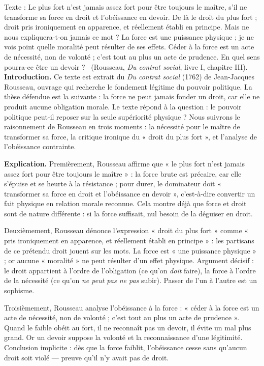 \documentclass[11pt]{article}
\begin{document}
\begin{exoresolu}
Texte : \guillemotleft Le plus fort n'est jamais assez fort pour être toujours le maître, s'il ne transforme sa force en droit et l'obéissance en devoir. De là le droit du plus fort ; droit pris ironiquement en apparence, et réellement établi en principe. Mais ne nous expliquera-t-on jamais ce mot ? La force est une puissance physique ; je ne vois point quelle moralité peut résulter de ses effets. Céder à la force est un acte de nécessité, non de volonté ; c'est tout au plus un acte de prudence. En quel sens pourra-ce être un devoir ? \guillemotright\ (Rousseau, \emph{Du contrat social}, livre I, chapitre III).
\tcblower
\textbf{Introduction.} Ce texte est extrait du \emph{Du contrat social} (1762) de Jean-Jacques Rousseau, ouvrage qui recherche le fondement légitime du pouvoir politique. La thèse défendue est la suivante : la force ne peut jamais fonder un droit, car elle ne produit aucune obligation morale. Le texte répond à la question : le pouvoir politique peut-il reposer sur la seule supériorité physique ? Nous suivrons le raisonnement de Rousseau en trois moments : la nécessité pour le maître de transformer sa force, la critique ironique du « droit du plus fort », et l'analyse de l'obéissance contrainte.

\textbf{Explication.} Premièrement, Rousseau affirme que « le plus fort n'est jamais assez fort pour être toujours le maître » : la force brute est précaire, car elle s'épuise et se heurte à la résistance ; pour durer, le dominateur doit « transformer sa force en droit et l'obéissance en devoir », c'est-à-dire convertir un fait physique en relation morale reconnue. Cela montre déjà que force et droit sont de nature différente : si la force suffisait, nul besoin de la déguiser en droit.

Deuxièmement, Rousseau dénonce l'expression « droit du plus fort » comme « pris ironiquement en apparence, et réellement établi en principe » : les partisans de ce prétendu droit jouent sur les mots. La force est « une puissance physique » ; or aucune « moralité » ne peut résulter d'un effet physique. Argument décisif : le droit appartient à l'ordre de l'obligation (ce qu'on \emph{doit} faire), la force à l'ordre de la nécessité (ce qu'on \emph{ne peut pas ne pas} subir). Passer de l'un à l'autre est un sophisme.

Troisièmement, Rousseau analyse l'obéissance à la force : « céder à la force est un acte de nécessité, non de volonté ; c'est tout au plus un acte de prudence ». Quand le faible obéit au fort, il ne reconnaît pas un devoir, il évite un mal plus grand. Or un devoir suppose la volonté et la reconnaissance d'une légitimité. Conclusion implicite : dès que la force faiblit, l'obéissance cesse sans qu'aucun droit soit violé — preuve qu'il n'y avait pas de droit.


\end{exoresolu}
\end{document}
